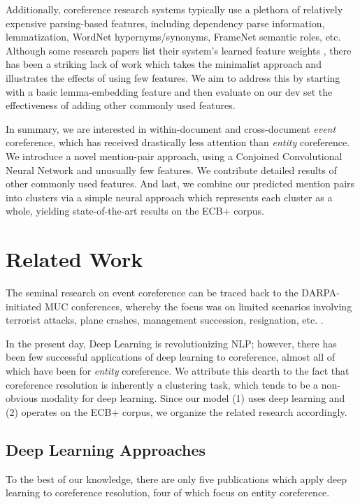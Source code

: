 \documentclass[11pt,a4paper]{article}
\begin{document}
Additionally, coreference research systems typically use a plethora of relatively expensive parsing-based features, including dependency parse information, lemmatization, WordNet hypernyms/synonyms, FrameNet semantic roles, etc.  Although some research papers list their system's learned feature weights \cite{journals/tacl/YangCF15}, there has been a striking lack of work which takes the minimalist approach and illustrates the effects of using few features.  We aim to address this by starting with a basic lemma-embedding feature and then evaluate on our dev set the effectiveness of adding other commonly used features.

In summary, we are interested in within-document and cross-document \textit{event} coreference, which has received drastically less attention than \textit{entity} coreference. We introduce a novel mention-pair approach, using a Conjoined Convolutional Neural Network and unusually few features.  We contribute detailed results of other commonly used features.  And last, we combine our predicted mention pairs into clusters via a simple neural approach which represents each cluster as a whole, yielding state-of-the-art results on the ECB+ corpus.


\section{Related Work}
The seminal research on event coreference can be traced back to the DARPA-initiated MUC conferences, whereby the focus was on limited scenarios involving terrorist attacks, plane crashes, management succession, resignation, etc. \cite{Humphreys:1997,Bagga:1999:CEC:1608810.1608812}.

In the present day, Deep Learning is revolutionizing NLP; however, there has been few successful applications of deep learning to coreference, almost all of which have been for \textit{entity} coreference.  We attribute this dearth to the fact that coreference resolution is inherently a clustering task, which tends to be a non-obvious modality for deep learning.  Since our model (1) uses deep learning and (2) operates on the ECB+ corpus, we organize the related research accordingly.

\subsection{Deep Learning Approaches}
To the best of our knowledge, there are only five publications which apply deep learning to coreference resolution, four of which focus on entity coreference.
\end{document}
